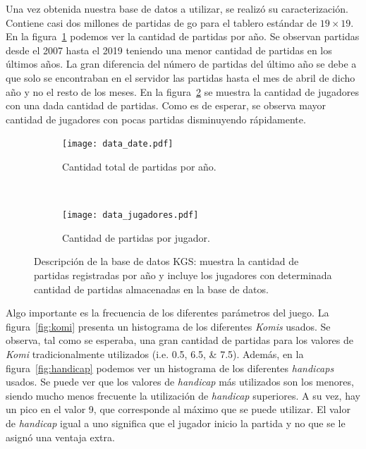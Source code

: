 \documentclass[11pt,twoside,spanish]{report} %
\begin{document}
Una vez obtenida nuestra base de datos a utilizar, se realiz\'o su caracterizaci\'on.
Contiene casi dos millones de partidas de go para el tablero est\'andar de $19\times19$.
En la figura~\ref{fig:data} podemos ver la cantidad de partidas por a\~no.
Se observan partidas desde el 2007 hasta el 2019 teniendo una menor cantidad de partidas en los \'ultimos a\~nos.
La gran diferencia del n\'umero de partidas del \'ultimo a\~no se debe a que solo se encontraban en el servidor las partidas hasta el mes de abril de dicho a\~no y no el resto de los meses.
En la figura~\ref{fig:jugadores} se muestra la cantidad de jugadores con una dada cantidad de partidas.
Como es de esperar, se observa mayor cantidad de jugadores con pocas partidas disminuyendo r\'apidamente.

\begin{figure}[H]
	\centering
	\begin{subfigure}[t]{.49\textwidth}
		\centering
		\texttt{[image: data\_date.pdf]}
		\caption{Cantidad total de partidas por a\~no.}
		\label{fig:data}
	\end{subfigure}
	~
	\begin{subfigure}[t]{.49\textwidth}
		\centering
		\texttt{[image: data\_jugadores.pdf]}
		\caption{Cantidad de partidas por jugador.}
		\label{fig:jugadores}
	\end{subfigure}
	\caption{Descripci\'on de la base de datos KGS:  muestra la cantidad de partidas registradas por a\~no y  incluye los jugadores con determinada cantidad de partidas almacenadas en la base de datos. }
	\label{fig:dataJugadores}
\end{figure}



Algo importante es la frecuencia de los diferentes par\'ametros del juego.
La figura~\ref{fig:komi} presenta un histograma de los diferentes \textit{Komis} usados.
Se observa, tal como se esperaba, una gran cantidad de partidas para los valores de \textit{Komi} tradicionalmente utilizados (i.e. \numlist{0.5;6.5;7.5}).
Adem\'as, en la figura~\ref{fig:handicap} podemos ver un histograma de los diferentes \textit{handicaps} usados.
Se puede ver que los valores de \emph{handicap} m\'as utilizados son los menores, siendo mucho menos frecuente la utilizaci\'on de \emph{handicap} superiores.
A su vez, hay un pico en el valor 9, que corresponde al m\'aximo que se puede utilizar.
El valor de \emph{handicap} igual a uno significa que el jugador inicio la partida y no que se le asign\'o una ventaja extra.
\end{document}
